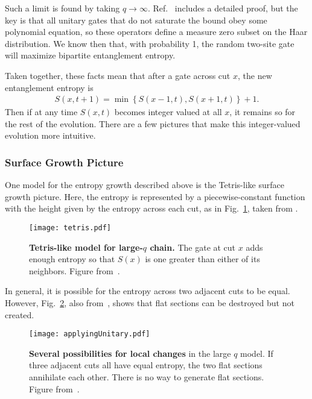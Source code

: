 Such a limit is found by taking $q\to\infty$. Ref.~\cite{Nahum2017} includes a detailed proof, but the key is that all unitary gates that do not saturate the bound obey some polynomial equation, so these operators define a measure zero subset on the Haar distribution. We know then that, with probability 1, the random two-site gate will maximize bipartite entanglement entropy.

Taken together, these facts mean that after a gate across cut $x$, the new entanglement entropy is
\begin{align}
S(x, t+1) = \min\left\lbrace S(x-1, t), S(x+1, t)\right\rbrace + 1.
	\label{eqn:update}
\end{align}
Then if at any time $S(x,t)$ becomes integer valued at all $x$, it remains so for the rest of the evolution. There are a few pictures that make this integer-valued evolution more intuitive.

\subsubsection{Surface Growth Picture}  \label{subsub:surfgrowth}

One model for the entropy growth described above is the Tetris-like surface growth picture. Here, the entropy is represented by a piecewise-constant function with the height given by the entropy across each cut, as in Fig.~\ref{fig:tetris}, taken from \cite{Nahum2017}. 
\begin{figure}
	\centering
	\texttt{[image: tetris.pdf]}
	\caption{\textbf{Tetris-like model for large-$q$ chain.} The gate at cut $x$ adds enough entropy so that $S(x)$ is one greater than either of its neighbors. Figure from~\cite{Nahum2017}.}
	\label{fig:tetris}
\end{figure}
In general, it is possible for the entropy across two adjacent cuts to be equal. However, Fig.~\ref{fig:applyingUnitary}, also from~\cite{Nahum2017}, shows that flat sections can be destroyed but not created. 
\begin{figure}
	\centering
	\texttt{[image: applyingUnitary.pdf]}
	\caption{\textbf{Several possibilities for local changes} in the large $q$ model. If three adjacent cuts all have equal entropy, the two flat sections annihilate each other. There is no way to generate flat sections. Figure from~\cite{Nahum2017}.}
	\label{fig:applyingUnitary}
\end{figure}

